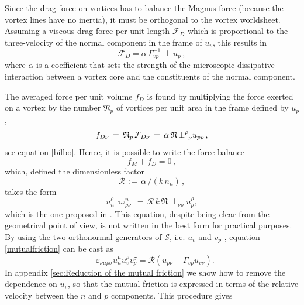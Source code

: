 \documentclass[usenatbib%
]{mnras}
\begin{document}
Since the  drag force on vortices has to balance the Magnus force (because the vortex lines have no inertia), it must be orthogonal to the vortex worldsheet. Assuming a viscous drag force per unit length $\mathcal{F}_D$ which is proportional to the three-velocity of the normal component in the frame of $u_v$, this results in
\begin{equation}\label{rtbjbnrtonbortlg}
\mathcal{F}_D = \alpha  \, \Gamma_{vp}^{-1} \,  {\perp} u_p  \,  ,
\end{equation}
where $\alpha$ is a coefficient that sets the strength of the microscopic dissipative interaction between a vortex core and the constituents of the normal component. 
 
The averaged force per unit volume $f_D$ is found by multiplying the force exerted on a vortex by the number $\mathfrak{N}_p$ of vortices per unit area in the frame defined by  $u_p$,  
\begin{equation}
f_{D\nu} \,=\, \mathfrak{N}_p \, \mathcal{F}_{D\nu} 
\,=\, \alpha \,\mathfrak{N} \,{\perp}\indices{^\rho _\nu}u_{p\rho} \, ,
\end{equation}
see equation \eqref{bilbo}.
Hence, it is possible to write the force balance
\begin{equation}
f_M + f_D =0 \, ,
\end{equation}
which, defined the dimensionless factor
\begin{equation}
\mathcal{R} \, := \, \alpha \,  / ( k \, n_n ) \, ,
\end{equation}
takes the form
\begin{equation}\label{mutualfriction}
u_n^\rho \, \varpi^n_{\rho \nu} \, = \, \mathcal{R} \, k \, \mathfrak{N} \, {\perp}_{\nu \rho}  u_p^\rho,
\end{equation}
which is the one proposed in \cite{langlois98}. 
This equation, despite being clear from the geometrical point of view, is not written in the best form for practical purposes. 
By using the two orthonormal generators of $\mathcal{S}$, i.e. $u_v$ and $v_p$ ,
equation  \eqref{mutualfriction} can be cast as
\begin{equation}\label{mutualfriction2}
-\varepsilon_{\nu \mu \rho \sigma} u_n^\mu u_v^\rho v_p^\sigma = \mathcal{R}(u_{p\nu} -\Gamma_{vp}u_{v\nu}).
\end{equation}
In appendix \ref{sec:Reduction of the mutual friction} we show how to remove the dependence on $u_v$, so that the mutual friction is expressed in terms of the relative velocity between the $n$ and $p$ components. This procedure gives 
\end{document}
